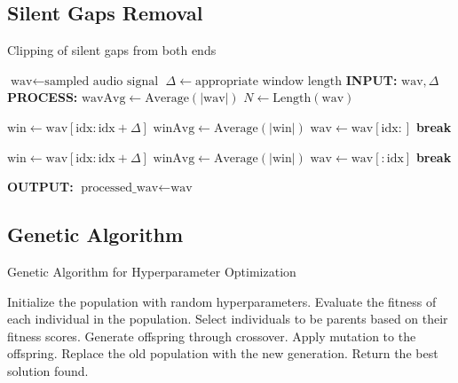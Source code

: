 \subsection{Silent Gaps Removal}
\label{alg:Silence_Removal}
\begin{algorithm}
    \caption{Clipping of silent gaps from both ends}
    \begin{algorithmic}[1]
    \STATE $ \text{wav} \gets \text{sampled audio signal} $
    \STATE $ \Delta \gets \text{appropriate window length} $
    \STATE {}
    \STATE \textbf{INPUT:} $ \text{wav}, \Delta $
    \STATE \textbf{PROCESS:}
    \STATE $ \text{wavAvg} \gets \text{Average}(|\text{wav}|) $
    \STATE $ N \gets \text{Length}(\text{wav}) $
    
    \STATE {}
        \STATE $ \text{win} \gets \text{wav}[\text{idx} : \text{idx} + \Delta] $
        \STATE $ \text{winAvg} \gets \text{Average}(|\text{win}|) $
            \STATE $ \text{wav} \gets \text{wav}[\text{idx} :] $
            \STATE \textbf{break}
        \ENDIF
    \ENDFOR
    
    \STATE {}
        \STATE $ \text{win} \gets \text{wav}[\text{idx} : \text{idx} + \Delta] $
        \STATE $ \text{winAvg} \gets \text{Average}(|\text{win}|) $
            \STATE $ \text{wav} \gets \text{wav}[: \text{idx}] $
            \STATE \textbf{break}
        \ENDIF
    \ENDFOR
    
    \STATE \textbf{OUTPUT:} $ \text{processed\_wav} \gets \text{wav} $
    \end{algorithmic}
    \end{algorithm}


\subsection{Genetic Algorithm}
\begin{algorithm}[H]
\caption{Genetic Algorithm for Hyperparameter Optimization}
\begin{algorithmic}[1]
\STATE Initialize the population with random hyperparameters.
    \STATE Evaluate the fitness of each individual in the population.
    \STATE Select individuals to be parents based on their fitness scores.
    \STATE Generate offspring through crossover.
    \STATE Apply mutation to the offspring.
    \STATE Replace the old population with the new generation.
\ENDFOR
\STATE Return the best solution found.
\end{algorithmic}
\end{algorithm}

